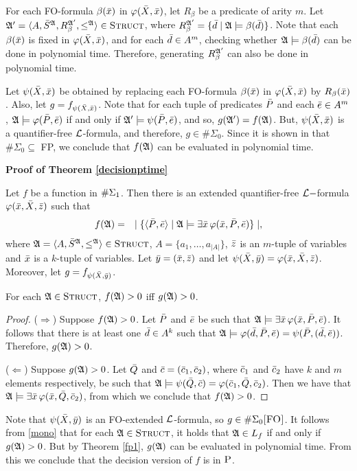 For each {\sc FO}-formula $\beta(\x)$ in $\varphi(\X,\x)$, let $R_{\beta}$ be a predicate of arity $m$. Let $\A^\prime = \langle A, \S^{\A}, R_{\beta}^{\A^\prime}, \leq^{\A} \rangle \in \str$, where $R_{\beta}^{\A^\prime} = \{\d \mid \A \models \beta(\d)\}$. Note that each $\beta(\x)$ is fixed in $\varphi(\X,\x)$, and for each $\d \in A^m$, checking whether $\A \models \beta(\d)$ can be done in polynomial time. Therefore, generating $R_{\beta}^{\A^\prime}$ can also be done in polynomial time.

Let $\psi(\X,\x)$ be obtained by replacing each {\sc FO}-formula $\beta(\x)$ in $\varphi(\X,\x)$ by $R_{\beta}(\x)$. Also, let $g = f_{\psi(\X,\x)}$. Note that for each tuple of predicates $\P$ and each $\e \in A^m$, $\A \models \varphi(\P,\e)$ if and only if $\A^\prime \models \psi(\P,\e)$, and so, $g(\A^\prime) = f(\A)$. But, $\psi(\X,\x)$ is a quantifier-free $\L$-formula, and therefore, $g \in \#\Sigma_0$. Since it is shown in \cite{DBLP:journals/jcss/SalujaST95} that $\#\Sigma_0 \subseteq$ {\sc FP}, we conclude that $f(\A)$ can be evaluated in polynomial time.
	
\textbf{Proof of Theorem \ref{decisionptime}}

Let $f$ be a function in $\E{1}$. Then there is an extended quantifier-free $\L-$formula $\varphi(\x,\X,\z)$ such that
\begin{eqnarray*}
	f(\A) &=& \mid \{ \langle\P,\e\rangle \mid \A \models \exists \x \, \varphi(\x,\P,\e) \} \mid,
\end{eqnarray*}
where $\A = \langle A, \S^{\A}, \leq^{\A} \rangle \in \str$, $A = \{a_1,\ldots,a_{\vert A \vert}\}$, $\z$ is an $m$-tuple of variables and $\x$ is a $k$-tuple of variables. Let $\y = (\x,\z)$ and let $\psi(\X,\y) = \varphi(\x,\X,\z)$. Moreover, let $g = f_{\psi(\X,\y)}$.
\begin{claim} \label{mono}
	For each $\A \in \str$, $f(\A) > 0$ iff $g(\A) > 0$.
\end{claim}
\begin{proof}
	($\Rightarrow$) Suppose $f(\A) > 0$. Let $\P$ and $\e$ be such that $\A \models \exists \x \, \varphi(\x,\P,\e)$. It follows that there is at least one $\d \in A^k$ such that $\A \models \varphi(\d,\P,\e) = \psi(\P,(\d,\e))$. Therefore, $g(\A) > 0$. 
	
	($\Leftarrow$) Suppose $g(\A) > 0$. Let $\Q$ and $\c = (\c_1,\c_2)$, where $\c_1$ and $\c_2$ have $k$ and $m$ elements respectively, be such that $\A \models \psi(\Q,\c) = \varphi(\c_1,\Q,\c_2)$. Then we have that $\A \models \exists \x \, \varphi(\x,\Q,\c_2)$, from which we conclude that $f(\A) > 0$.
\end{proof}
Note that $\psi(\X,\y)$ is an {\sc FO}-extended $\L$-formula, so $g \in\XE{0}$. It follows from \ref{mono} that for each $\A \in \str$, it holds that $\A \in L_f$ if and only if $g(\A) > 0$. But by Theorem \ref{fp1}, $g(\A)$ can be evaluated in polynomial time. From this we conclude that the decision version of $f$ is in $\ptime$.
	
